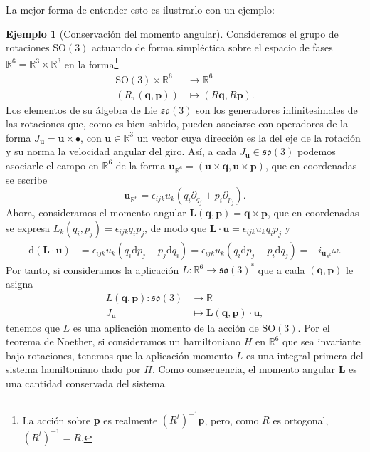 \documentclass[11pt,a4paper,twoside]{article}
\theoremstyle{definition} \newtheorem{defn}[thm]{Definición}
\theoremstyle{definition} \newtheorem{ejemplo}[thm]{Ejemplo}
\theoremstyle{definition} \newtheorem{ejercicio}[thm]{Ejercicio}
\theoremstyle{remark} \newtheorem*{obs}{Observación}
\def\RR{\mathbb{R}}
\def\dd{\mathrm{d}}
\newcommand{\vect}[1]{\mathbf{#1}}
\begin{document}
  La mejor forma de entender esto es ilustrarlo con un ejemplo:
  \begin{ejemplo}[Conservación del momento angular]
    Consideremos el grupo de rotaciones $\mathrm{SO}(3)$ actuando de forma simpléctica sobre el espacio de fases $\RR^6=\RR^3\times \RR^3$ en la forma\footnote{La acción sobre $\vect{p}$ es realmente $(R^t)^{-1}\vect{p}$, pero, como $R$ es ortogonal, $(R^t)^{-1}=R$.}
    \begin{align*}
      \mathrm{SO}(3)\times \RR^6&\longrightarrow \RR^6\\ 
      (R,(\vect{q},\vect{p})) &\longmapsto (R\vect{q},R\vect{p}) .
      \end{align*} 
      Los elementos de su álgebra de Lie $\mathfrak{so}(3)$ son los generadores infinitesimales de las rotaciones que, como es bien sabido, pueden asociarse con operadores de la forma $J_{\vect{u}}=\vect{u}\times \bullet$, con $\vect{u}\in \RR^3$ un vector cuya dirección es la del eje de la rotación y su norma la velocidad angular del giro. Así, a cada $J_{\vect{u}}\in \mathfrak{so}(3)$ podemos asociarle el campo en $\RR^6$ de la forma $\vect{u}_{\RR^6}=(\vect{u}\times \vect{q}, \vect{u}\times \vect{p})$, que en coordenadas se escribe
      \begin{equation*}
	\vect{u}_{\RR^6}=\epsilon_{ijk}u_k(q_i \partial_{q_j}+p_i \partial_{p_j}).
      \end{equation*}
      Ahora, consideramos el momento angular $\vect{L}(\vect{q},\vect{p})=\vect{q}\times \vect{p}$, que en coordenadas se expresa $L_k(q_i,p_j)=\epsilon_{ijk}q_ip_j$, de modo que $\vect{L}\cdot\vect{u}=\epsilon_{ijk}u_kq_ip_j$ y 
      \begin{align*}
	\dd(\vect{L}\cdot \vect{u})&=\epsilon_{ijk}u_k(q_i\dd p_j + p_j\dd q_i)=\epsilon_{ijk}u_k(q_i\dd p_j - p_i\dd q_j)=-i_{\vect{u}_{\RR^6}}\omega.
      \end{align*}
      Por tanto, si consideramos la aplicación $L:\RR^6\rightarrow\mathfrak{so}(3)^*$ que a cada $(\vect{q},\vect{p})$ le asigna  
      \begin{align*}
	L(\vect{q},\vect{p}) :\mathfrak{so}(3)&\longrightarrow \RR\\ 
	J_\vect{u} &\longmapsto \vect{L}(\vect{q},\vect{p})\cdot \vect{u},
	\end{align*}
	tenemos que $L$ es una aplicación momento de la acción de $\mathrm{SO}(3)$. Por el teorema de Noether, si consideramos un hamiltoniano $H$ en $\RR^6$ que sea invariante bajo rotaciones, tenemos que la aplicación momento $L$ es una integral primera del sistema hamiltoniano dado por $H$. Como consecuencia, el momento angular $\vect{L}$ es una cantidad conservada del sistema.
  \end{ejemplo}
\end{document}
